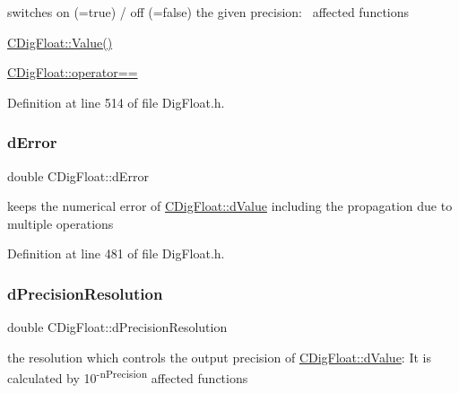 switches on (=true) / off (=false) the given precision\+:~\newline
 affected functions 


\begin{DoxyItemize}
\item \hyperlink{classCDigFloat_af74b8cd0935294b6371f551b7a1ff640}{C\+Dig\+Float\+::\+Value()}
\item \hyperlink{classCDigFloat_ad8980d984bf2bab71d15b830fd0180a5}{C\+Dig\+Float\+::operator==} 
\end{DoxyItemize}

Definition at line 514 of file Dig\+Float.\+h.

\mbox{\label{classCDigFloat_a25eb3782d1e727ff007a48f8308e3d4d}} 
\subsubsection{\texorpdfstring{d\+Error}{dError}}
{\footnotesize\ttfamily double C\+Dig\+Float\+::d\+Error\hspace{0.3cm}{\ttfamily [protected]}}



keeps the numerical error of \hyperlink{classCDigFloat_a4bbe69e30dd4e20527362493aa9aaf96}{C\+Dig\+Float\+::d\+Value} including the propagation due to multiple operations 



Definition at line 481 of file Dig\+Float.\+h.

\mbox{\label{classCDigFloat_a7f9809fa0b25da57f5c8c18a02b7d1a7}} 
\subsubsection{\texorpdfstring{d\+Precision\+Resolution}{dPrecisionResolution}}
{\footnotesize\ttfamily double C\+Dig\+Float\+::d\+Precision\+Resolution\hspace{0.3cm}{\ttfamily [protected]}}



the resolution which controls the output precision of \hyperlink{classCDigFloat_a4bbe69e30dd4e20527362493aa9aaf96}{C\+Dig\+Float\+::d\+Value}\+: It is calculated by 10\textsuperscript{-\/n\+Precision} affected functions 


